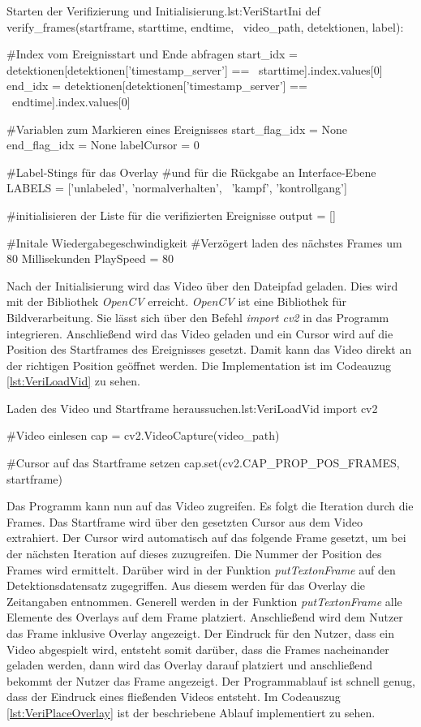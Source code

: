 \begin{pythoncode}{Starten der Verifizierung und Initialisierung.}{lst:VeriStartIni}
def verify_frames(startframe, starttime, endtime, \ 
        video_path, detektionen, label):
    
    #Index vom Ereignisstart und Ende abfragen
    start_idx = detektionen[detektionen['timestamp_server'] == \ 
        starttime].index.values[0]
    end_idx = detektionen[detektionen['timestamp_server'] == \ 
        endtime].index.values[0]
    
    #Variablen zum Markieren eines Ereignisses
    start_flag_idx = None
    end_flag_idx = None
    labelCursor = 0

    #Label-Stings für das Overlay 
    #und für die Rückgabe an Interface-Ebene
    LABELS = ['unlabeled', 'normalverhalten', \ 
              'kampf', 'kontrollgang']

    #initialisieren der Liste für die verifizierten Ereignisse
    output = []

    #Initale Wiedergabegeschwindigkeit
    #Verzögert laden des nächstes Frames um 80 Millisekunden 
    PlaySpeed = 80
\end{pythoncode}

Nach der Initialisierung wird das Video über den Dateipfad geladen. Dies wird mit der Bibliothek \textit{OpenCV} erreicht. \textit{OpenCV} ist eine Bibliothek für Bildverarbeitung. Sie lässt sich über den Befehl \textit{import cv2} in das Programm integrieren. Anschließend wird das Video geladen und ein Cursor wird auf die Position des Startframes des Ereignisses gesetzt. Damit kann das Video direkt an der richtigen Position geöffnet werden. Die Implementation ist im Codeauzug \ref{lst:VeriLoadVid} zu sehen.

\begin{pythoncode}{Laden des Video und Startframe heraussuchen.}{lst:VeriLoadVid}
import cv2

#Video einlesen
cap = cv2.VideoCapture(video_path)

#Cursor auf das Startframe setzen
cap.set(cv2.CAP_PROP_POS_FRAMES, startframe)
\end{pythoncode}

Das Programm kann nun auf das Video zugreifen. Es folgt die Iteration durch die Frames. Das Startframe wird über den gesetzten Cursor aus dem Video extrahiert. Der Cursor wird automatisch auf das folgende Frame gesetzt, um bei der nächsten Iteration auf dieses zuzugreifen. Die Nummer der Position des Frames wird ermittelt. Darüber wird in der Funktion \textit{putTextonFrame} auf den Detektionsdatensatz zugegriffen. Aus diesem werden für das Overlay die Zeitangaben entnommen. Generell werden in der Funktion \textit{putTextonFrame} alle Elemente des Overlays auf dem Frame platziert. Anschließend wird dem Nutzer das Frame inklusive Overlay angezeigt. Der Eindruck für den Nutzer, dass ein Video abgespielt wird, entsteht somit darüber, dass die Frames nacheinander geladen werden, dann wird das Overlay darauf platziert und anschließend bekommt der Nutzer das Frame angezeigt. Der Programmablauf ist schnell genug, dass der Eindruck eines fließenden Videos entsteht. Im Codeauszug \ref{lst:VeriPlaceOverlay} ist der beschriebene Ablauf implementiert zu sehen.

